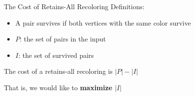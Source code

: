 \begin{frame}{The Cost of Retains-All Recoloring}
Definitions:
\begin{itemize}
\boldmath
\pause\item
A pair \alert{survives} if both vertices with the same color survive

\pause\item
$P$: the set of pairs in the input  

\pause\item
$I$: the set of survived pairs
 
\end{itemize}

\pause\begin{observation}
The cost of a retains-all recoloring is $|P| - |I|$
\end{observation}

\pause
That is, we would like to \textbf{maximize $|I|$}

\end{frame}